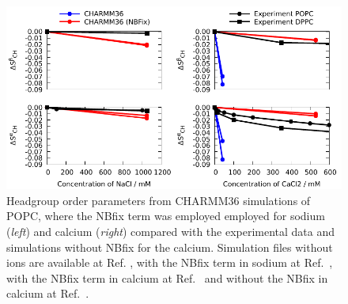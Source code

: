 \documentclass[journal=jpcbfk,manuscript=article]{achemso}
\begin{document}
\begin{figure}[]
  \centering
  \includegraphics[width=17.0cm]{../Figs/OP_CHARMM_CaCl_POPC_NBFix.pdf}
  \caption{\label{OP_CHARMM_CaCl_POPC_NBFix}
    Headgroup order parameters from CHARMM36 simulations of POPC, where the NBfix term was employed employed for sodium \cite{venable13} ({\it left})
    and calcium \cite{kim16} ({\it right}) compared with the experimental data \cite{akutsu81,altenbach84}
    and simulations without NBfix for the calcium.
    Simulation files without ions are available at Ref. ,
    with the NBfix term in sodium at Ref.~, 
    with the NBfix term in calcium at Ref.~ and
    without the NBfix in calcium at Ref.~.
  }
\end{figure}
\end{document}

